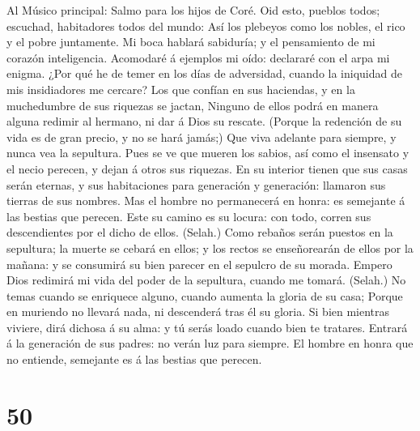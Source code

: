  Al Músico principal: Salmo para los hijos de Coré. Oid
esto, pueblos todos; escuchad, habitadores todos del mundo:
 Así los plebeyos como los nobles, el rico y el pobre
juntamente.  Mi boca hablará sabiduría; y el pensamiento
de mi corazón inteligencia.  Acomodaré á ejemplos mi oído:
declararé con el arpa mi enigma.  ¿Por qué he de temer en
los días de adversidad, cuando la iniquidad de mis insidiadores me
cercare?  Los que confían en sus haciendas, y en la
muchedumbre de sus riquezas se jactan,  Ninguno de ellos
podrá en manera alguna redimir al hermano, ni dar á Dios su rescate.
 (Porque la redención de su vida es de gran precio, y no
se hará jamás;)  Que viva adelante para siempre, y nunca
vea la sepultura.  Pues se ve que mueren los sabios, así
como el insensato y el necio perecen, y dejan á otros sus riquezas.
 En su interior tienen que sus casas serán eternas, y sus
habitaciones para generación y generación: llamaron sus tierras de sus
nombres.  Mas el hombre no permanecerá en honra: es
semejante á las bestias que perecen.  Este su camino es
su locura: con todo, corren sus descendientes por el dicho de ellos.
(Selah.)  Como rebaños serán puestos en la sepultura; la
muerte se cebará en ellos; y los rectos se enseñorearán de ellos por la
mañana: y se consumirá su bien parecer en el sepulcro de su morada.
 Empero Dios redimirá mi vida del poder de la sepultura,
cuando me tomará. (Selah.)  No temas cuando se enriquece
alguno, cuando aumenta la gloria de su casa;  Porque en
muriendo no llevará nada, ni descenderá tras él su gloria.
 Si bien mientras viviere, dirá dichosa á su alma: y tú
serás loado cuando bien te tratares.  Entrará á la
generación de sus padres: no verán luz para siempre.  El
hombre en honra que no entiende, semejante es á las bestias que perecen.

\hypertarget{section-49}{%
\section{50}\label{section-49}}

